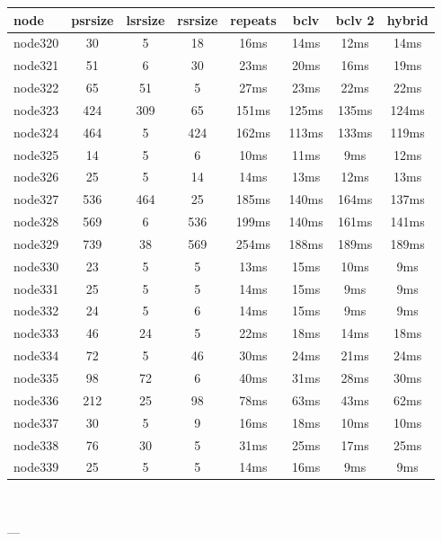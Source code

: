\begin{tabular}{|l|c|c|c|c|c|c|c|}
\hline node & psrsize & lsrsize & rsrsize   & repeats & bclv & bclv 2 & hybrid\\
    \hline node320 & 30 & 5 & 18 & 16ms & 14ms & 12ms & 14ms\\
    \hline node321 & 51 & 6 & 30 & 23ms & 20ms & 16ms & 19ms\\
    \hline node322 & 65 & 51 & 5 & 27ms & 23ms & 22ms & 22ms\\
    \hline node323 & 424 & 309 & 65 & 151ms & 125ms & 135ms & 124ms\\
    \hline node324 & 464 & 5 & 424 & 162ms & 113ms & 133ms & 119ms\\
    \hline node325 & 14 & 5 & 6 & 10ms & 11ms & 9ms & 12ms\\
    \hline node326 & 25 & 5 & 14 & 14ms & 13ms & 12ms & 13ms\\
    \hline node327 & 536 & 464 & 25 & 185ms & 140ms & 164ms & 137ms\\
    \hline node328 & 569 & 6 & 536 & 199ms & 140ms & 161ms & 141ms\\
    \hline node329 & 739 & 38 & 569 & 254ms & 188ms & 189ms & 189ms\\
    \hline node330 & 23 & 5 & 5 & 13ms & 15ms & 10ms & 9ms\\
    \hline node331 & 25 & 5 & 5 & 14ms & 15ms & 9ms & 9ms\\
    \hline node332 & 24 & 5 & 6 & 14ms & 15ms & 9ms & 9ms\\
    \hline node333 & 46 & 24 & 5 & 22ms & 18ms & 14ms & 18ms\\
    \hline node334 & 72 & 5 & 46 & 30ms & 24ms & 21ms & 24ms\\
    \hline node335 & 98 & 72 & 6 & 40ms & 31ms & 28ms & 30ms\\
    \hline node336 & 212 & 25 & 98 & 78ms & 63ms & 43ms & 62ms\\
    \hline node337 & 30 & 5 & 9 & 16ms & 18ms & 10ms & 10ms\\
    \hline node338 & 76 & 30 & 5 & 31ms & 25ms & 17ms & 25ms\\
    \hline node339 & 25 & 5 & 5 & 14ms & 16ms & 9ms & 9ms\\

\hline
\end{tabular} \

---


